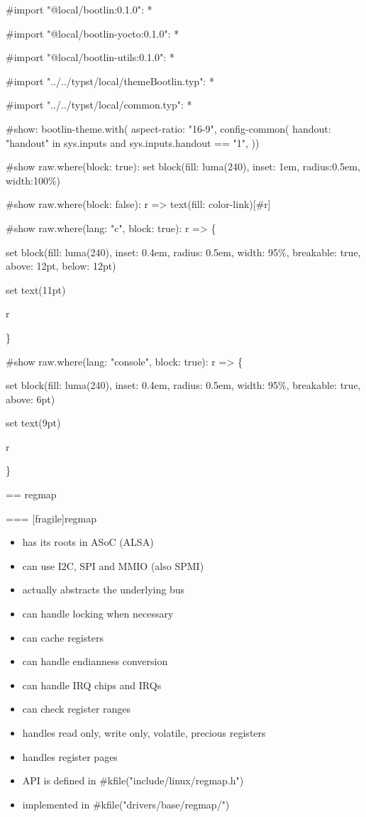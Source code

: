 #import "@local/bootlin:0.1.0": * 

#import "@local/bootlin-yocto:0.1.0": *

#import "@local/bootlin-utils:0.1.0": *

#import "../../typst/local/themeBootlin.typ": *

#import "../../typst/local/common.typ": *

#show: bootlin-theme.with(
  aspect-ratio: "16-9",
config-common(
  handout: "handout" in sys.inputs and sys.inputs.handout == "1",
))

#show raw.where(block: true): set block(fill: luma(240), inset: 1em, radius:0.5em, width:100\%) 

#show raw.where(block: false): r => { text(fill: color-link)[#r] } 

#show raw.where(lang: "c", block: true): r => \{

set block(fill: luma(240),
inset: 0.4em,
radius: 0.5em,
width: 95\%, breakable: true, above: 12pt, below: 12pt)

set text(11pt)

r

\} 


#show raw.where(lang: "console", block: true): r => \{

set block(fill: luma(240),
inset: 0.4em,
radius: 0.5em,
width: 95\%, breakable: true, above: 6pt)

set text(9pt)

r

\} 

 == regmap

=== [fragile]{regmap}
  \begin{itemize}
    \item has its roots in ASoC (ALSA)
    \item can use I2C, SPI and MMIO (also SPMI)
    \item actually abstracts the underlying bus
    \item can handle locking when necessary
    \item can cache registers
    \item can handle endianness conversion
    \item can handle IRQ chips and IRQs
    \item can check register ranges
    \item handles read only, write only, volatile, precious registers
    \item handles register pages
    \item API is defined in #kfile("include/linux/regmap.h")
    \item implemented in #kfile("drivers/base/regmap/")
  \end{itemize}


